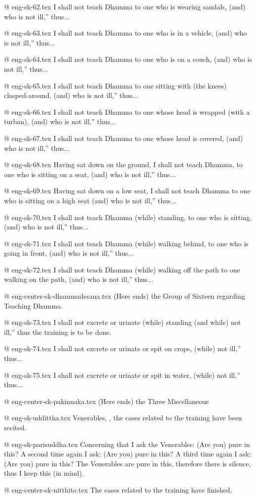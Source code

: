 @  eng-sk-62.tex
I shall not teach Dhamma to one who is wearing sandals, (and) who is not ill,” thus...

@  eng-sk-63.tex
I shall not teach Dhamma to one who is in a vehicle, (and) who is not ill,” thus...

@  eng-sk-64.tex
I shall not teach Dhamma to one who is on a couch, (and) who is not ill,” thus...

@  eng-sk-65.tex
I shall not teach Dhamma to one sitting with (the knees) clasped-around, (and) who is not ill,” thus...

@  eng-sk-66.tex
I shall not teach Dhamma to one whose head is wrapped (with a turban), (and) who is not ill,” thus...

@  eng-sk-67.tex
I shall not teach Dhamma to one whose head is covered, (and) who is not ill,” thus...

@  eng-sk-68.tex
Having sat down on the ground, I shall not teach Dhamma, to one who is sitting on a seat, (and) who is not ill,” thus...

@  eng-sk-69.tex
Having sat down on a low seat, I shall not teach Dhamma to one who is sitting on a high seat (and) who is not ill,” thus...

@  eng-sk-70.tex
I shall not teach Dhamma (while) standing, to one who is sitting, (and) who is not ill,” thus...

@  eng-sk-71.tex
I shall not teach Dhamma (while) walking behind, to one who is going in front, (and) who is not ill,” thus...

@  eng-sk-72.tex
I shall not teach Dhamma (while) walking off the path to one walking on the path, (and) who is not ill,” thus...

@ eng-center-sk-dhammadesana.tex
(Here ends) the Group of Sixteen regarding Teaching Dhamma.

@ eng-sk-73.tex
I shall not excrete or urinate (while) standing (and while) not ill,” thus the training is to be done.

@  eng-sk-74.tex
I shall not excrete or urinate or spit on crops, (while) not ill,” thus...

@  eng-sk-75.tex
I shall not excrete or urinate or spit in water, (while) not ill,” thus...

@ eng-center-sk-pakinnaka.tex
(Here ends) the Three Miscellaneous

@ eng-sk-uddittha.tex
Venerables, , the cases related to the training have been recited.

@ eng-sk-parisuddha.tex
Concerning that I ask the Venerables: (Are you) pure in this?
A second time again I ask: (Are you) pure in this?
A third time again I ask: (Are you) pure in this?
The Venerables are pure in this, therefore there is silence, thus I keep this (in mind).

@ eng-center-sk-nitthito.tex
The cases related to the training have finished.
